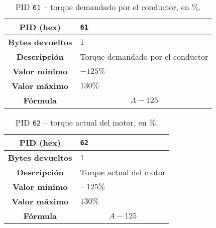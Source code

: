 \begin{table}[H]
  \centering
  \begin{tabularx}{\textwidth}{|c|X|}
    \hline
    \textbf{PID (hex)}       & \texttt{61}                    \\
    \hline
    \textbf{Bytes devueltos} & $1$                            \\
    \hline
    \textbf{Descripción}     & Torque demandado por el conductor \\
    \hline
    \textbf{Valor mínimo}    & $-125\%$                          \\
    \hline
    \textbf{Valor máximo}    & $130\%$                        \\
    \hline
    \textbf{Fórmula}         &                                %
    \begin{equation*}
      A - 125
    \end{equation*}                                 \\
    \hline
  \end{tabularx}
  \caption{\ac{PID} \texttt{61} -- torque demandado por el conductor, en $\%$.}
\end{table}

\begin{table}[H]
  \centering
  \begin{tabularx}{\textwidth}{|c|X|}
    \hline
    \textbf{PID (hex)}       & \texttt{62}                    \\
    \hline
    \textbf{Bytes devueltos} & $1$                            \\
    \hline
    \textbf{Descripción}     & Torque actual del motor \\
    \hline
    \textbf{Valor mínimo}    & $-125\%$                          \\
    \hline
    \textbf{Valor máximo}    & $130\%$                        \\
    \hline
    \textbf{Fórmula}         &                                %
    \begin{equation*}
      A - 125
    \end{equation*}                                 \\
    \hline
  \end{tabularx}
  \caption{\ac{PID} \texttt{62} -- torque actual del motor, en $\%$.}
\end{table}

